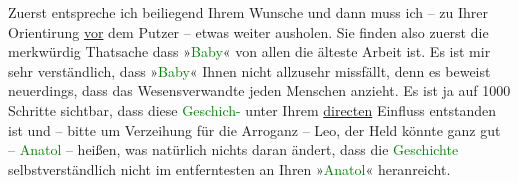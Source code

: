 \pstart
           Zuerst entspreche ich beiliegend Ihrem Wunsche und dann muss ich – zu Ihrer
               Orientirung \uline{vor} dem Putzer – etwas weiter ausholen.
               Sie finden also zuerst die merkwürdig Thatsache dass »\textcolor{green}{Baby}{}\ledrightnote{\textcolor{green}{Baby}}« von allen die älteste Arbeit ist. Es ist mir sehr
               verständlich, dass »\textcolor{green}{Baby}{}\ledrightnote{\textcolor{green}{Baby}}« Ihnen nicht allzusehr
               missfällt, denn es beweist neuerdings, dass das Wesensverwandte jeden Menschen
               anzieht. Es ist ja auf 1000 Schritte sichtbar, dass diese \textcolor{green}{Geschich- }{}\ledrightnote{{$\rightarrow$}\textcolor{green}{Baby}}{\pb}unter Ihrem \uline{directen} Einfluss entstanden ist und – bitte um
               Verzeihung für die Arroganz – Leo, der Held könnte ganz gut – \textcolor{green}{Anatol}{}\ledrightnote{{$\rightarrow$}\textcolor{green}{Anatol}} – heißen, was natürlich nichts  daran ändert, dass die \textcolor{green}{Geschichte}{}\ledrightnote{{$\rightarrow$}\textcolor{green}{Baby}} selbstverständlich nicht im
               entferntesten an Ihren »\textcolor{green}{Anatol}{}\ledrightnote{\textcolor{green}{Anatol}}« heranreicht.\pend
           
